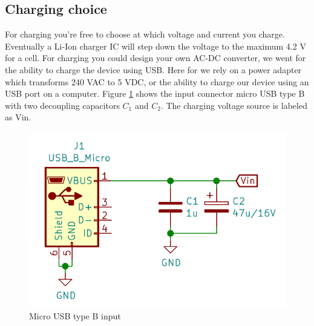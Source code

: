 \documentclass[11pt,a4paper]{article}
\begin{document}
\subsection{Charging choice}
For charging you're free to choose at which voltage and current you charge. Eventually a Li-Ion charger IC will step down the voltage to the maximum 4.2 V for a cell. For charging you could design your own AC-DC converter, we went for the ability to charge the device using USB. Here for we rely on a power adapter which transforms 240 VAC to 5 VDC, or the ability to charge our device using an USB port on a computer. Figure \ref{fig:microUSBinput} shows the input connector micro USB type B with two decoupling capacitors $C_1$ and $C_2$. The charging voltage source is labeled as Vin.
\begin{figure}[H]
	\centering
	\includegraphics[width=0.8\linewidth]{microUSBinput.png}
	\caption{Micro USB type B input}
	\label{fig:microUSBinput}
\end{figure}
\end{document}
